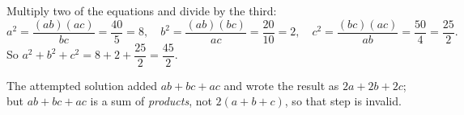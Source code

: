Multiply two of the equations and divide by the third:
\[a^2=\dfrac{(ab)(ac)}{bc}=\dfrac{40}{5}=8,\quad b^2=\dfrac{(ab)(bc)}{ac}=\dfrac{20}{10}=2,\quad c^2=\dfrac{(bc)(ac)}{ab}=\dfrac{50}{4}=\dfrac{25}{2}.\]
So $a^2+b^2+c^2=8+2+\dfrac{25}{2}=\boxed{\dfrac{45}{2}}$.

The attempted solution added $ab+bc+ac$ and wrote the result as $2a+2b+2c$; but $ab+bc+ac$ is a sum of \emph{products}, not $2(a+b+c)$, so that step is invalid.
